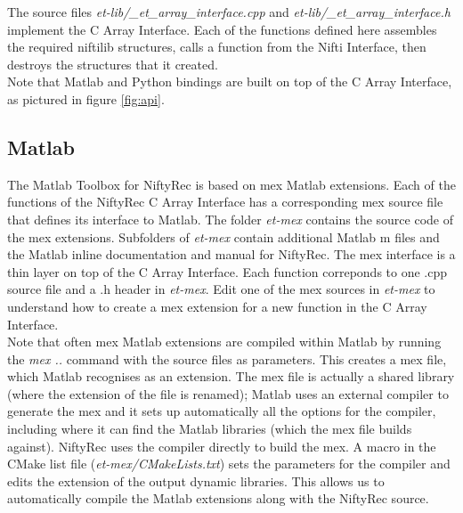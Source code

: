 \documentclass[12pt,a4paper]{report}
\begin{document}
The source files \emph{et-lib/\_et\_array\_interface.cpp} and \emph{et-lib/\_et\_array\_interface.h} implement the C Array Interface. 
Each of the functions defined here assembles the required niftilib structures, calls a function from the Nifti Interface, then destroys the structures that 
it created. \\

Note that Matlab and Python bindings are built on top of the C Array Interface, as pictured in figure \ref{fig:api}.

\subsection{Matlab}
The Matlab Toolbox for NiftyRec is based on mex Matlab extensions. 
Each of the functions of the NiftyRec C Array Interface has a corresponding mex source file that 
defines its interface to Matlab. The folder \emph{et-mex} contains the source code of the mex extensions. 
Subfolders of \emph{et-mex} contain additional Matlab m files and the Matlab inline documentation and manual for NiftyRec.
The mex interface is a thin layer on top of the C Array Interface. Each function correponds to one .cpp source file and a .h header 
in \emph{et-mex}. Edit one of the mex sources in \emph{et-mex} to understand how to create a mex extension for a new function in the C Array Interface.\\

Note that often mex Matlab extensions are compiled within Matlab by running the \emph{mex ..} command with the source files as parameters. This creates a mex file, which 
Matlab recognises as an extension. The mex file is actually a shared library (where the extension of the file is renamed); Matlab uses an external compiler to generate the mex 
and it sets up automatically all the options for the compiler, including where it can find the Matlab libraries (which the mex file builds against). NiftyRec uses the compiler 
directly to build the mex. A macro in the CMake list file (\emph{et-mex/CMakeLists.txt}) sets the parameters for the compiler and edits the extension of the output dynamic libraries. This allows us to automatically compile the Matlab extensions along with the NiftyRec source.
\end{document}
